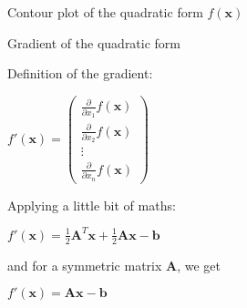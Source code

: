 \documentclass[\classoption]{beamer}
\begin{document}
\begin{frame}{Contour plot of the quadratic form $f(\mathbf{x})$}

\begin{center}
\end{center}
\vspace{-0.5cm}
\end{frame}

\begin{frame}{Gradient of the quadratic form}

\begin{block}{Definition of the gradient:}
\vspace{0.25cm}
\begin{center}
$f'(\mathbf{x})=\begin{pmatrix}
\frac{\partial }{\partial x_1} f(\mathbf{x}) \\
\frac{\partial }{\partial x_2} f(\mathbf{x}) \\
\vdots \\
\frac{\partial }{\partial x_n} f(\mathbf{x})
\end{pmatrix}$
\end{center}
\end{block}
Applying a little bit of maths:

\begin{center}
$f'(\mathbf{x}) = \frac{1}{2} \mathbf{A}^T \mathbf{x} + \frac{1}{2} \mathbf{A} \mathbf{x}-\mathbf{b}$
\end{center}
and for a symmetric matrix $\mathbf{A}$, we get
\begin{center}
$f'(\mathbf{x})= \mathbf{A}\mathbf{x}-\mathbf{b}$
\end{center}
\end{frame}
\end{document}

